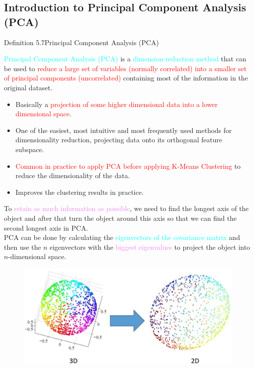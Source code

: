 \documentclass{book}
\begin{document}
\subsection{Introduction to Principal Component Analysis (PCA)}
\begin{defBox}{Definition 5.7}{Principal Component Analysis (PCA)}
    \raggedright
    \textcolor{cyan}{Principal Component Analysis (PCA)} is a \textcolor{cyan}{dimension-reduction method} that can be used to \textcolor{red}{reduce a large set of variables (normally correlated) into a smaller set of principal components (uncorrelated)} containing most of the information in the original dataset.\\
    \begin{itemize}
        \item Basically a \textcolor{red}{projection of some higher dimensional data into a lower dimensional space}.
        \item One of the easiest, most intuitive and most frequently used methods for dimensionality reduction, projecting data onto its orthogonal feature subspace.
        \item \textcolor{red}{Common in practice to apply PCA before applying K-Means Clustering} to reduce the dimensionality of the data.
        \item Improves the clustering results in practice.
    \end{itemize}
\end{defBox}
To \textcolor{violet}{retain as much information as possible}, we need to find the longest axis of the object and after that turn the object around this axis so that we can find the second longest axis in PCA.\\
PCA can be done by calculating the \textcolor{cyan}{eigenvectors of the covariance matrix} and then use the \(n\) eigenvectors with the \textcolor{violet}{biggest eigenvalues} to project the object into \(n\)-dimensional space.\\
\begin{figure}[h]
    \centering
    \includegraphics[scale=0.3]{chapter 5/ch5_figure14.jpeg}
\end{figure}
\newpage
\end{document}
